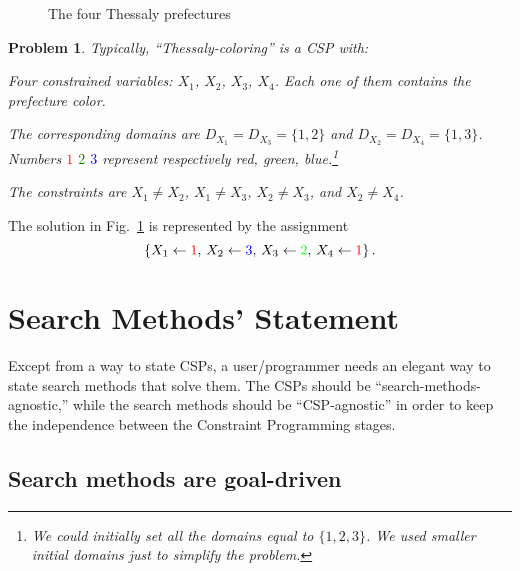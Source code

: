 \documentclass{ws-ijait}
\newtheorem{problem}{Problem}
\begin{document}
\begin{figure}
  \centering
  
  \caption{The four Thessaly prefectures\label{map-colored}}
\end{figure}

\begin{problem}
  \label{thessaly-coloring}
  Typically, \emph{``Thessaly-coloring''} is a CSP with:
  \begin{romanlist}
    \item Four constrained variables: $X_1$, $X_2$, $X_3$,
          $X_4$. Each one of them contains the prefecture
          color.
    \item The corresponding domains are $D_{X_1} = D_{X_3} =
          \{1, 2\}$ and $D_{X_2} = D_{X_4} = \{1, 3\}$.
          Numbers \textcolor{red}{$1$}
          \textcolor{green}{$2$} \textcolor{blue}{$3$}
          represent respectively red, green,
          blue.\footnote{We could initially set all the
          domains equal to $\{1, 2, 3\}$. We used smaller
          initial domains just to simplify the problem.}
    \item The constraints are $X_1 \neq X_2$, $X_1 \neq
          X_3$, $X_2 \neq X_3$, and $X_2 \neq X_4$.
  \end{romanlist}
\end{problem}
The solution in Fig.~\ref{map-colored} is represented by the
assignment
\begin{equation}
  \label{solution}
  \{ X_1 \gets \textcolor{red}{1}, \, X_2 \gets
  \textcolor{blue}{3}, \, X_3 \gets \textcolor{green}{2}, \,
  X_4 \gets \textcolor{red}{1} \} \, .
\end{equation}


\section{Search Methods' Statement}

Except from a way to state CSPs, a user\slash programmer
needs an elegant way to state search methods that solve
them. The CSPs should be ``search-methods-agnostic,'' while
the search methods should be ``CSP-agnostic'' in order to
keep the independence between the Constraint Programming
stages.

\subsection{Search methods are goal-driven}
\end{document}
